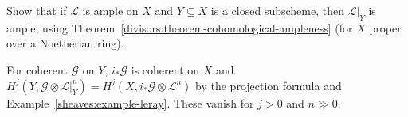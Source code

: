 \begin{exercise}\label{divisors:exercise-ample-restriction}
Show that if $\mathcal{L}$ is ample on $X$ and $Y \subseteq X$ is a closed subscheme, then $\mathcal{L}|_Y$ is ample, using Theorem~\ref{divisors:theorem-cohomological-ampleness}
(for $X$ proper over a Noetherian ring).
\end{exercise}

\begin{solution}
For coherent $\mathcal{G}$ on $Y$, $i_*\mathcal{G}$ is coherent on $X$ and $H^j(Y, \mathcal{G} \otimes \mathcal{L}|_Y^n) = H^j(X, i_*\mathcal{G} \otimes \mathcal{L}^n)$ by the projection formula and
Example~\ref{sheaves:example-leray}. These vanish for $j > 0$ and $n \gg 0$.
\end{solution}
